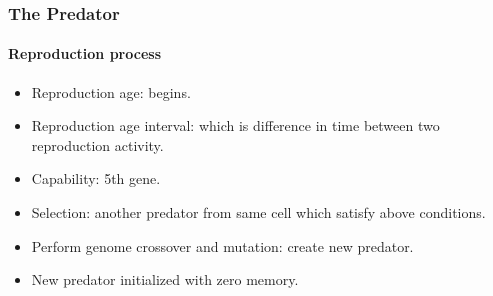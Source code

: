 \frame
{
	\frametitle{The Predator}
	\framesubtitle{Reproduction process}
	
	\begin{itemize}
		\item Reproduction age: begins.
		\item Reproduction age interval: which is difference in time between two reproduction activity.
		\item Capability: 5th gene.
		\item Selection: another predator from same cell which satisfy above conditions.
		\item Perform genome crossover and mutation: create new predator.
		\item New predator initialized with zero memory.
	\end{itemize}
}
